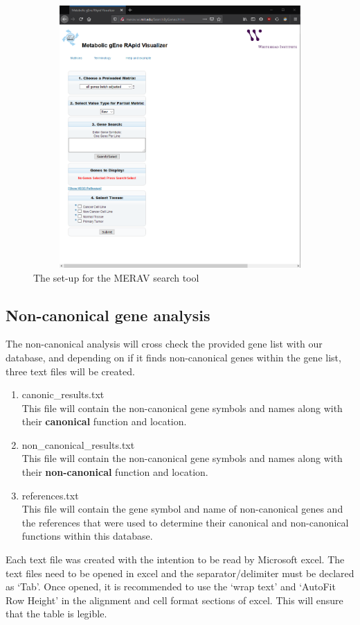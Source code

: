 \documentclass[11pt]{article}
\begin{document}
\begin{figure}[h!]
\centering
\includegraphics[width=15cm,height=10cm,keepaspectratio]{MERAV.png}
\caption{The set-up for the MERAV search tool}
\label{fig:merav}
\end{figure}

\subsection{Non-canonical gene analysis}
The non-canonical analysis will cross check the provided gene list with our database, and depending on if it finds non-canonical genes within the gene list, three text files will be created.
\begin{enumerate}
\item canonic\_results.txt\\
This file will contain the non-canonical gene symbols and names along with their \textbf{canonical} function and location.
\item non\_canonical\_results.txt\\
This file will contain the non-canonical gene symbols and names along with their \textbf{non-canonical} function and location.
\item references.txt\\
This file will contain the gene symbol and name of non-canonical genes and the references that were used to determine their canonical and non-canonical functions within this database.
\end{enumerate}
Each text file was created with the intention to be read by Microsoft excel. The text files need to be opened in excel and the separator/delimiter must be declared as `Tab'. Once opened, it is recommended to use the `wrap text' and `AutoFit Row Height' in the alignment and cell format sections of excel. This will ensure that the table is legible.
\end{document}
